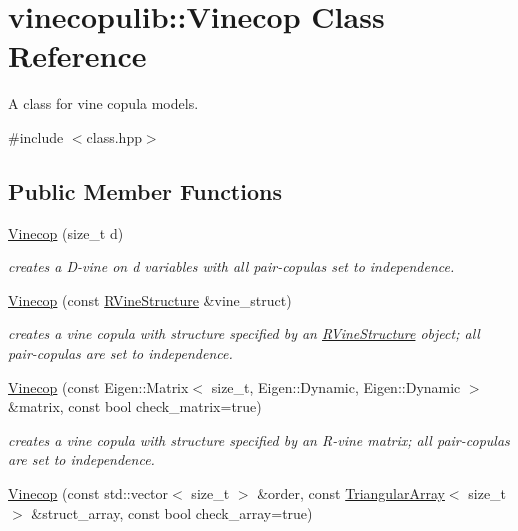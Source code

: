 \hypertarget{classvinecopulib_1_1_vinecop}{}\section{vinecopulib\+:\+:Vinecop Class Reference}
\label{classvinecopulib_1_1_vinecop}


A class for vine copula models.  




{\ttfamily \#include $<$class.\+hpp$>$}

\subsection*{Public Member Functions}
\begin{DoxyCompactItemize}
\item 
\hyperlink{classvinecopulib_1_1_vinecop_a391541e2795d06a848d5a17fe3496a63}{Vinecop} (size\+\_\+t d)
\begin{DoxyCompactList}\small\item\em creates a D-\/vine on {\ttfamily d} variables with all pair-\/copulas set to independence. \end{DoxyCompactList}\item 
\hyperlink{classvinecopulib_1_1_vinecop_abebc47fd9c68aeff199a3eba370a5f6a}{Vinecop} (const \hyperlink{classvinecopulib_1_1_r_vine_structure}{R\+Vine\+Structure} \&vine\+\_\+struct)
\begin{DoxyCompactList}\small\item\em creates a vine copula with structure specified by an \hyperlink{classvinecopulib_1_1_r_vine_structure}{R\+Vine\+Structure} object; all pair-\/copulas are set to independence. \end{DoxyCompactList}\item 
\hyperlink{classvinecopulib_1_1_vinecop_a2cb5079a1a3cfe0403969aba92092ac3}{Vinecop} (const Eigen\+::\+Matrix$<$ size\+\_\+t, Eigen\+::\+Dynamic, Eigen\+::\+Dynamic $>$ \&matrix, const bool check\+\_\+matrix=true)
\begin{DoxyCompactList}\small\item\em creates a vine copula with structure specified by an R-\/vine matrix; all pair-\/copulas are set to independence. \end{DoxyCompactList}\item 
\hyperlink{classvinecopulib_1_1_vinecop_af54ae0403aaa188052c63e959e70f90f}{Vinecop} (const std\+::vector$<$ size\+\_\+t $>$ \&order, const \hyperlink{classvinecopulib_1_1_triangular_array}{Triangular\+Array}$<$ size\+\_\+t $>$ \&struct\+\_\+array, const bool check\+\_\+array=true)

\end{DoxyCompactItemize}

